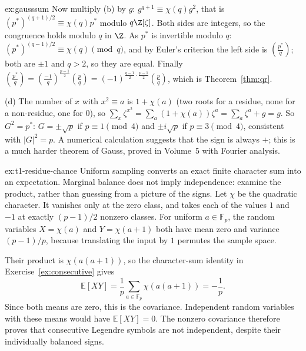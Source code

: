 \begin{solution}{ex:gausssum}
Now multiply (b) by $g$: $g^{q+1}\equiv\chi(q)g^2$, that is $(p^*)^{(q+1)/2}\equiv\chi(q)p^*$ modulo $q\Z[\zeta]$. Both sides are integers, so the congruence holds modulo $q$ in $\Z$. As $p^*$ is invertible modulo $q$: $(p^*)^{(q-1)/2}\equiv\chi(q)\pmod q$, and by Euler's criterion the left side is $\left(\frac{p^*}q\right)$; both are $\pm1$ and $q>2$, so they are equal. Finally $\left(\frac{p^*}q\right)=\left(\frac{-1}q\right)^{\frac{p-1}2}\left(\frac pq\right)=(-1)^{\frac{q-1}2\cdot\frac{p-1}2}\left(\frac pq\right)$, which is Theorem~\ref{thm:qr}.

(d) The number of $x$ with $x^2\equiv a$ is $1+\chi(a)$ (two roots for a residue, none for a non-residue, one for $0$), so $\sum_x\zeta^{x^2}=\sum_a(1+\chi(a))\zeta^a=\sum_a\zeta^a+g=g$. So $G^2=p^*$: $G=\pm\sqrt p$ if $p\equiv1\pmod4$ and $\pm i\sqrt p$ if $p\equiv3\pmod4$, consistent with $|G|^2=p$. A numerical calculation suggests that the sign is always $+$; this is a much harder theorem of Gauss, proved in Volume~5 with Fourier analysis.
\end{solution}

\begin{solution}{ex:t1-residue-chance}
\idea Uniform sampling converts an exact finite character sum into an
expectation. Marginal balance does not imply independence: examine the
product, rather than guessing from a picture of the signs.
\writeup Let $\chi$ be the quadratic character. It vanishes only at the zero class, and takes each of the values $1$ and $-1$ at exactly $(p-1)/2$ nonzero classes. For uniform $a\in\mathbb F_p$, the random variables $X=\chi(a)$ and $Y=\chi(a+1)$ both have mean zero and variance $(p-1)/p$, because translating the input by $1$ permutes the sample space.

Their product is $\chi(a(a+1))$, so the character-sum identity in Exercise~\ref{ex:consecutive} gives
\[
\mathbb E[XY]=\frac1p\sum_{a\in\mathbb F_p}\chi(a(a+1))=-\frac1p.
\]
Since both means are zero, this is the covariance. Independent random variables with these means would have $\mathbb E[XY]=0$. The nonzero covariance therefore proves that consecutive Legendre symbols are not independent, despite their individually balanced signs.
\end{solution}

